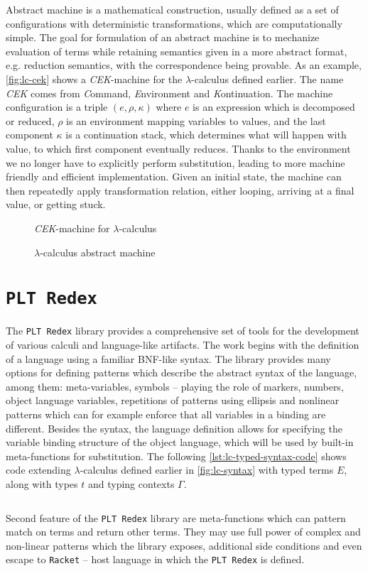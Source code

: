 \documentclass[inz, english, shortabstract]{iithesis}
\newcommand{\Redex}{\texttt{PLT Redex}}
\newcommand{\Racket}{\texttt{Racket}}
\newcommand{\LC}{\(\lambda\)-calculus}
\begin{document}
Abstract machine is a mathematical construction, usually defined as a set of configurations with deterministic transformations, which are computationally simple.
The goal for formulation of an abstract machine is to mechanize evaluation of terms while retaining semantics given in a more abstract format, e.g. reduction semantics, with the correspondence being provable\cite{Felleisen2009}.
As an example, \autoref{fig:lc-cek} shows a \emph{CEK}-machine for the \LC{} defined earlier.
The name \emph{CEK} comes from \emph{C}ommand, \emph{E}nvironment and \emph{K}ontinuation.
The machine configuration is a triple $ (e, \rho, \kappa) $ where $ e $ is an expression which is decomposed or reduced, $ \rho $ is an environment mapping variables to values, and the last component $ \kappa $ is a continuation stack, which determines what will happen with value, to which first component eventually reduces.
Thanks to the environment we no longer have to explicitly perform substitution, leading to more machine friendly and efficient implementation.
Given an initial state, the machine can then repeatedly apply transformation relation, either looping, arriving at a final value, or getting stuck. 
\begin{figure}
  \emph{CEK}-machine for \LC{}
  \caption{\LC{} abstract machine}
  \label{fig:lc-cek}
\end{figure}

\section{\Redex}
The \Redex{}\cite{Felleisen2009} library provides a comprehensive set of tools for the development of various calculi and language-like artifacts.
The work begins with the definition of a language using a familiar BNF-like syntax.
The library provides many options for defining patterns which describe the abstract syntax of the language, among them: meta-variables, symbols -- playing the role of markers, numbers, object language variables, repetitions of patterns using ellipsis and nonlinear patterns which can for example enforce that all variables in a binding are different.
Besides the syntax, the language definition allows for specifying the variable binding structure of the object language, which will be used by built-in meta-functions for substitution.
The following \autoref{lst:lc-typed-syntax-code} shows code extending \LC{} defined earlier in \autoref{fig:lc-syntax} with typed terms $ E $, along with types $ t $ and typing contexts $ \Gamma $.
\begin{listing}[H]
  \inputminted[firstline=26, lastline=32]{Racket}{../lc/lc.rkt}
  \caption{Typed \LC{} with numbers in \Redex{}}
  \label{lst:lc-typed-syntax-code}
\end{listing}
Second feature of the \Redex{} library are meta-functions which can pattern match on terms and return other terms.
They may use full power of complex and non-linear patterns which the library exposes, additional side conditions and even escape to \Racket{} -- host language in which the \Redex{} is defined.
\end{document}
